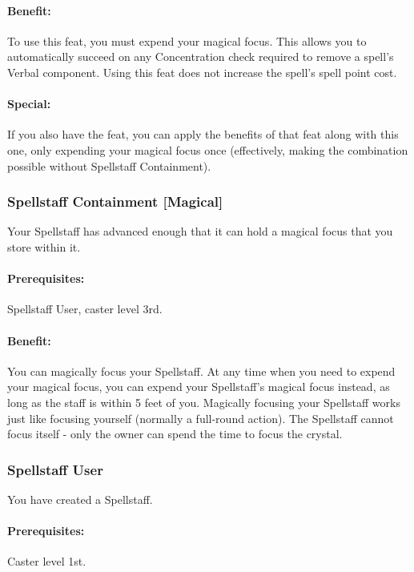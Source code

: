 \paragraph{Benefit:} To use this feat, you must expend your magical focus.
This allows you to automatically succeed on any Concentration check required to remove a spell's Verbal component.
Using this feat does not increase the spell's spell point cost.

\paragraph{Special:} If you also have the  feat, you can apply the benefits of that feat along with this one, only expending your magical focus once 
(effectively, making the combination possible without Spellstaff Containment).
\subsubsection[Spellstaff Containment]{Spellstaff Containment [Magical]}
\label{Feat:SpellstaffContainment}
Your Spellstaff has advanced enough that it can hold a magical focus that you store within it.

\paragraph{Prerequisites:} Spellstaff User, caster level 3rd.

\paragraph{Benefit:} You can magically focus your Spellstaff. 
At any time when you need to expend your magical focus, you can expend your Spellstaff's magical focus instead, as long as the staff is within 5 feet of you. 
Magically focusing your Spellstaff works just like focusing yourself (normally a full-round action).
The Spellstaff cannot focus itself - only the owner can spend the time to focus the crystal.

\subsubsection{Spellstaff User}
\label{Feat:SpellstaffUser}
You have created a Spellstaff.

\paragraph{Prerequisites:} Caster level 1st.
 

